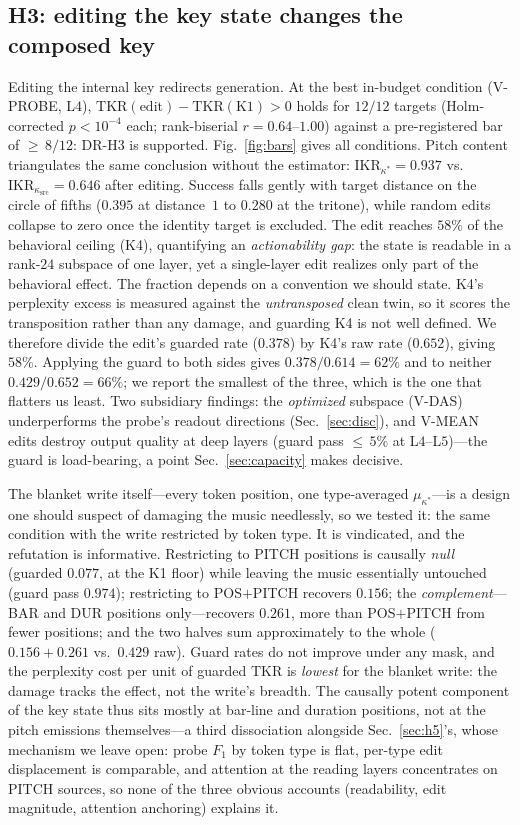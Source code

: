 \documentclass[conference]{IEEEtran}
\makeatletter
\newcommand{\tkr}{\mathrm{TKR}}
\newcommand{\ikr}{\mathrm{IKR}}
\newcommand{\vs}{vs.\@\ }
\makeatother
\begin{document}
\subsection{H3: editing the key state changes the composed key}
\label{sec:resultsB}
Editing the internal key redirects generation. At the best in-budget condition
(V-PROBE, L$4$), $\tkr(\text{edit})-\tkr(\text{K1})>0$ holds for $12/12$ targets
(Holm-corrected $p<10^{-4}$ each; rank-biserial $r=0.64$--$1.00$) against a
pre-registered bar of ${\geq}\,8/12$: DR-H3 is supported. Fig.~\ref{fig:bars} gives
all conditions. Pitch content triangulates the same conclusion without the
estimator: $\ikr_{\kappa^{*}}=0.937$ \vs $\ikr_{\kappa_{\mathrm{src}}}=0.646$ after
editing. Success falls gently with target distance on the circle of fifths ($0.395$
at distance~$1$ to $0.280$ at the tritone), while random edits collapse to zero once
the identity target is excluded. The edit reaches $58\%$ of the behavioral ceiling
(K4), quantifying an \emph{actionability gap}: the state is readable in a rank-$24$
subspace of one layer, yet a single-layer edit realizes only part of the behavioral
effect. The fraction depends on a convention we should state. K4's perplexity excess is
measured against the \emph{untransposed} clean twin, so it scores the transposition
rather than any damage, and guarding K4 is not well defined. We therefore divide the
edit's guarded rate ($0.378$) by K4's raw rate ($0.652$), giving $58\%$. Applying the
guard to both sides gives $0.378/0.614 = 62\%$ and to neither $0.429/0.652 = 66\%$; we
report the smallest of the three, which is the one that flatters us least. Two subsidiary findings: the \emph{optimized} subspace (V-DAS) underperforms
the probe's readout directions (Sec.~\ref{sec:disc}), and V-MEAN edits destroy output
quality at deep layers (guard pass ${\leq}\,5\%$ at L$4$--L$5$)---the guard is
load-bearing, a point Sec.~\ref{sec:capacity} makes decisive.

The blanket write itself---every token position, one type-averaged
$\mu_{\kappa^{*}}$---is a design one should suspect of damaging the music
needlessly, so we tested it: the same condition with the write restricted by token
type. It is vindicated, and the refutation is informative. Restricting to PITCH
positions is causally \emph{null} (guarded $0.077$, at the K1 floor) while leaving
the music essentially untouched (guard pass $0.974$); restricting to POS${+}$PITCH
recovers $0.156$; the \emph{complement}---BAR and DUR positions only---recovers
$0.261$, more than POS${+}$PITCH from fewer positions; and the two halves sum
approximately to the whole ($0.156{+}0.261$ \vs $0.429$ raw). Guard rates do not
improve under any mask, and the perplexity cost per unit of guarded $\tkr$ is
\emph{lowest} for the blanket write: the damage tracks the effect, not the write's
breadth. The causally potent component of the key state thus sits mostly at
bar-line and duration positions, not at the pitch emissions themselves---a third
dissociation alongside Sec.~\ref{sec:h5}'s, whose mechanism we leave open: probe
$F_1$ by token type is flat, per-type edit displacement is comparable, and
attention at the reading layers concentrates on PITCH sources, so none of the
three obvious accounts (readability, edit magnitude, attention anchoring)
explains it.
\end{document}
